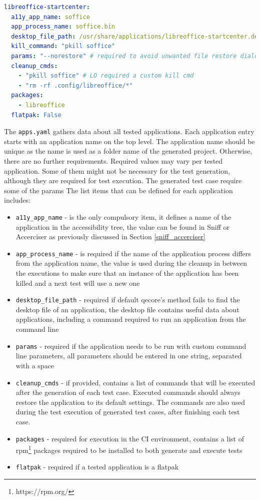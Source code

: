 \begin{lstlisting}[language=yaml,caption={Example of the apps.yaml entry for LibreOffice Start Center},label={apps.yaml}]
libreoffice-startcenter:
  a11y_app_name: soffice
  app_process_name: soffice.bin
  desktop_file_path: /usr/share/applications/libreoffice-startcenter.desktop
  kill_command: "pkill soffice"
  params: "--norestore" # required to avoid unwanted file restore dialogs
  cleanup_cmds:
    - "pkill soffice" # LO required a custom kill cmd
    - "rm -rf .config/libreoffice/*"
  packages:
    - libreoffice
  flatpak: False
\end{lstlisting}

The \texttt{apps.yaml} gathers data about all tested applications. Each application entry starts with an application name on the top level. The application name should be unique as the name is used as a folder name of the generated project. Otherwise, there are no further requirements. Required values may vary per tested application. Some of them might not be necessary for the test generation, although they are required for test execution.
The generated test case require some of the params 
The list items that can be defined for each application includes:

\begin{itemize}
    \item \texttt{a11y\_app\_name} - is the only compulsory item, it defines a name of the application in the accessibility tree, the value can be found in Sniff or Accerciser as previously discussed in Section \ref{sniff_accerciser}
     \item \texttt{app\_process\_name} - is required if the name of the application process differs from the application name, the value is used during the cleanup in between the executions to make sure that an instance of the application has been killed and a next test will use a new one
     \item \texttt{desktop\_file\_path} - required if default qecore's method fails to find the desktop file of an application, the desktop file contains useful data about applications, including a command required to run an application from the command line
     \item \texttt{params} - required if the application needs to be run with custom command line parameters, all parameters should be entered in one string, separated with a space
     \item \texttt{cleanup\_cmds} - if provided, contains a list of commands that will be executed after the generation of each test case. Executed commands should always restore the application to its default settings. The commands are also used during the test execution of generated test cases, after finishing each test case. 
     \item \texttt{packages} - required for execution in the CI environment, contains a list of rpm\footnote{https://rpm.org/} packages required to be installed to both generate and execute tests
     \item \texttt{flatpak} - required if a tested application is a flatpak
\end{itemize}

